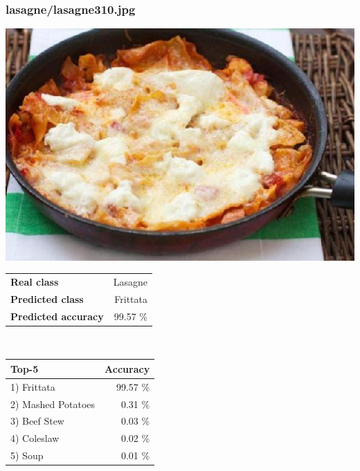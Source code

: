 \subsubsection{lasagne/lasagne310.jpg}

\begin{minipage}[t]{0.4\textwidth}
	\vspace{0pt}
	\includegraphics[width=\linewidth]{images/evaluation-images/lasagne/lasagne310.jpg}
\end{minipage}
\hfill
\begin{minipage}[t]{0.5\textwidth}
	\vspace{0pt}\raggedright
	\begin{tabularx}{\textwidth}{X r}
		\small \textbf{Real class} & \small Lasagne\\
		\small \textbf{Predicted class} & \small Frittata\\
		\small \textbf{Predicted accuracy} & \small 99.57 \%
    \end{tabularx}\\
    
    \vspace{6pt}
	\begin{tabularx}{\textwidth}{X r}
        \small \textbf{Top-5} & \small \textbf{Accuracy} \\
        \hline
		\small 1) Frittata & \small 99.57 \%\\\small 2) Mashed Potatoes & \small 0.31 \%\\\small 3) Beef Stew & \small 0.03 \%\\\small 4) Coleslaw & \small 0.02 \%\\\small 5) Soup & \small 0.01 \%
    \end{tabularx}
\end{minipage}
    
